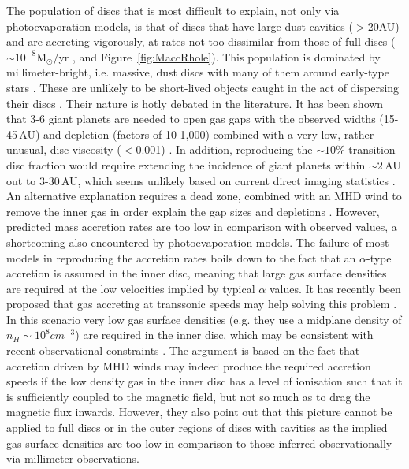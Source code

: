 \documentclass{rsos}
\begin{document}
The population of discs that is most difficult to explain, not only via photoevaporation models, is that of discs that have large dust cavities ($>$20AU) and are accreting vigorously, at rates not too dissimilar from those of full discs ($\sim 10^{-8}$M$_\odot$/yr
\cite{2014A&A...568A..18M}, and Figure~\ref{fig:MaccRhole}).
This population is dominated by millimeter-bright, i.e. massive, dust discs with many of them around early-type stars \cite{2012MNRAS.426L..96O}. These are unlikely to be short-lived objects caught in the act of dispersing their discs 
\cite{2016PASA...33....5O}.
Their nature is hotly debated in the literature. 
It has been shown that 3-6 giant planets are needed to open gas gaps with the observed widths (15-45\,AU) and depletion (factors of 10-1,000) combined with a very low, rather unusual, disc viscosity ($<$0.001) \cite{2016ApJ...825...77D} . In addition, reproducing the $\sim 10$\% transition disc fraction would require extending the incidence of giant planets within $\sim 2$\,AU out to 3-30\,AU, which seems unlikely based on current direct imaging statistics 
\cite{2016PASP..128j2001B}. An alternative explanation requires a dead zone, combined with an MHD wind to remove the inner gas in order  explain the gap sizes and depletions  \cite{2016A&A...596A..81P}. However, predicted mass accretion rates are too low in comparison with observed values, a shortcoming also encountered by photoevaporation models. The failure of most models in reproducing the accretion rates boils down to the fact that an $\alpha$-type accretion is assumed in the inner disc, meaning that large gas surface densities are required at the low velocities implied by typical $\alpha$ values.  
It has recently been proposed that gas accreting at transsonic speeds may help solving this problem \cite{2017ApJ...835...59W}. In this scenario very low gas surface densities (e.g. they use a midplane density of $n_H \sim 10^8 cm^{-3}$) are required in the inner disc, which may be consistent with recent observational constraints 
\cite{2016A&A...585A..58V}. The argument is based on the fact that accretion driven by MHD winds may indeed produce the required accretion speeds if the low density gas in the inner disc has a level of ionisation such that it is sufficiently coupled to the magnetic field, but not so much as to drag the magnetic flux inwards. However, they also point out that this picture cannot be applied to full discs or in the outer regions of discs with cavities as the implied gas surface densities are too low in comparison to those inferred observationally via millimeter observations.
\end{document}
